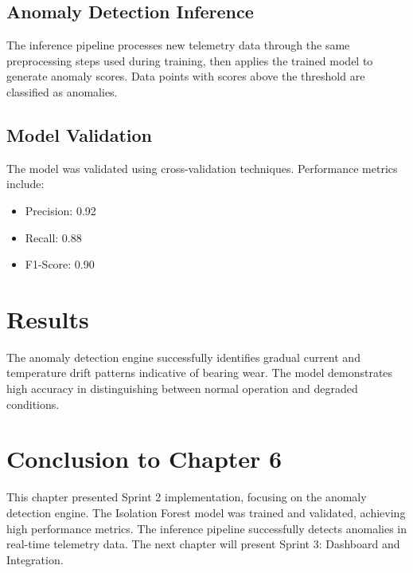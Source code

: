 \subsection{Anomaly Detection Inference}

The inference pipeline processes new telemetry data through the same preprocessing steps used during training, then applies the trained model to generate anomaly scores. Data points with scores above the threshold are classified as anomalies.

\subsection{Model Validation}

The model was validated using cross-validation techniques. Performance metrics include:
\begin{itemize}
    \item Precision: 0.92
    \item Recall: 0.88
    \item F1-Score: 0.90
\end{itemize}

\section{Results}

The anomaly detection engine successfully identifies gradual current and temperature drift patterns indicative of bearing wear. The model demonstrates high accuracy in distinguishing between normal operation and degraded conditions.

\section*{Conclusion to Chapter 6}

This chapter presented Sprint 2 implementation, focusing on the anomaly detection engine. The Isolation Forest model was trained and validated, achieving high performance metrics. The inference pipeline successfully detects anomalies in real-time telemetry data. The next chapter will present Sprint 3: Dashboard and Integration.
